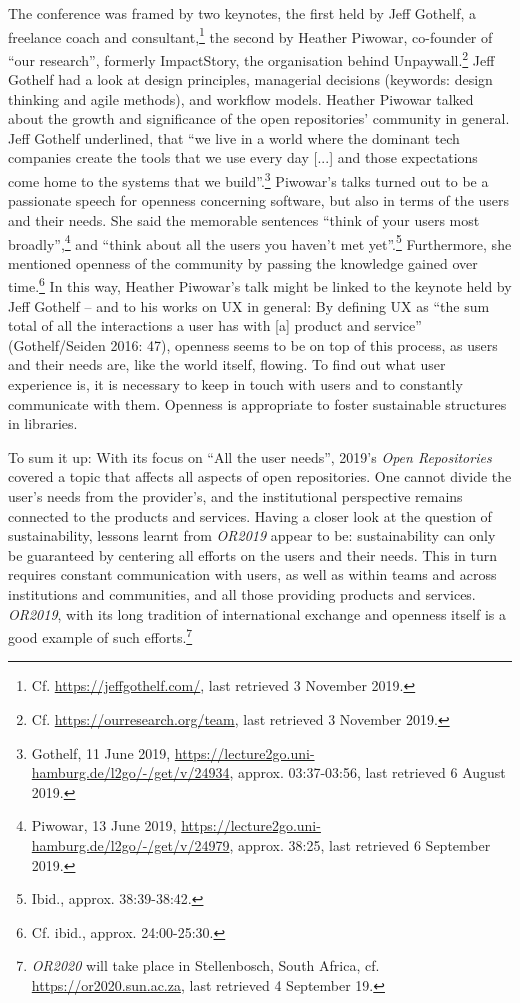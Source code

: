 \documentclass[a4paper,
fontsize=11pt,
oneside,
numbers=noperiodatend,
parskip=half-,
bibliography=totoc,
final
]{scrartcl}
\begin{document}
The conference was framed by two keynotes, the first held by Jeff
Gothelf, a freelance coach and consultant,\footnote{Cf.
  \url{https://jeffgothelf.com/}, last retrieved 3 November 2019.} the
second by Heather Piwowar, co-founder of \enquote{our research},
formerly ImpactStory, the organisation behind Unpaywall.\footnote{Cf.
  \url{https://ourresearch.org/team}, last retrieved 3 November 2019.}
Jeff Gothelf had a look at design principles, managerial decisions
(keywords: design thinking and agile methods), and workflow models.
Heather Piwowar talked about the growth and significance of the open
repositories' community in general. Jeff Gothelf underlined, that
\enquote{we live in a world where the dominant tech companies create the
tools that we use every day {[}...{]} and those expectations come home
to the systems that we build}.\footnote{Gothelf, 11 June 2019,
  \url{https://lecture2go.uni-hamburg.de/l2go/-/get/v/24934}, approx.
  03:37-03:56, last retrieved 6 August 2019.} Piwowar's talks turned out
to be a passionate speech for openness concerning software, but also in
terms of the users and their needs. She said the memorable sentences
\enquote{think of your users most broadly},\footnote{Piwowar, 13 June
  2019, \url{https://lecture2go.uni-hamburg.de/l2go/-/get/v/24979},
  approx. 38:25, last retrieved 6 September 2019.} and \enquote{think
about all the users you haven't met yet}.\footnote{Ibid., approx.
  38:39-38:42.} Furthermore, she mentioned openness of the community by
passing the knowledge gained over time.\footnote{Cf. ibid., approx.
  24:00-25:30.} In this way, Heather Piwowar's talk might be linked to
the keynote held by Jeff Gothelf -- and to his works on UX in general:
By defining UX as \enquote{the sum total of all the interactions a user
has with {[}a{]} product and service} (Gothelf/Seiden 2016: 47),
openness seems to be on top of this process, as users and their needs
are, like the world itself, flowing. To find out what user experience
is, it is necessary to keep in touch with users and to constantly
communicate with them. Openness is appropriate to foster sustainable
structures in libraries.

To sum it up: With its focus on \enquote{All the user needs}, 2019's
\emph{Open Repositories} covered a topic that affects all aspects of
open repositories. One cannot divide the user's needs from the
provider's, and the institutional perspective remains connected to the
products and services. Having a closer look at the question of
sustainability, lessons learnt from \emph{OR2019} appear to be:
sustainability can only be guaranteed by centering all efforts on the
users and their needs. This in turn requires constant communication with
users, as well as within teams and across institutions and communities,
and all those providing products and services. \emph{OR2019}, with its
long tradition of international exchange and openness itself is a good
example of such efforts.\footnote{\emph{OR2020} will take place in
  Stellenbosch, South Africa, cf. \url{https://or2020.sun.ac.za}, last
  retrieved 4 September 19.}
\end{document}
